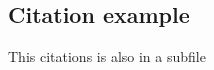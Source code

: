 \documentclass{subfiles}
\begin{document}
\subsection{Citation example}
This citations is also in a subfile \cite{some_reference}
\end{document}
